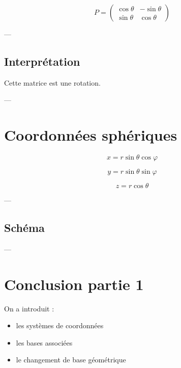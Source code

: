 \documentclass[11pt,a4paper]{article}
\begin{document}
\[
P =
\begin{pmatrix}
\cos\theta & -\sin\theta \\
\sin\theta & \cos\theta
\end{pmatrix}
\]

---

\subsection{Interprétation}

Cette matrice est une rotation.

---

\section{Coordonnées sphériques}

\[
x = r\sin\theta\cos\varphi
\]

\[
y = r\sin\theta\sin\varphi
\]

\[
z = r\cos\theta
\]

---

\subsection{Schéma}

\begin{center}
\end{center}

---

\section{Conclusion partie 1}

On a introduit :

\begin{itemize}
\item les systèmes de coordonnées
\item les bases associées
\item le changement de base géométrique
\end{itemize}
\end{document}
